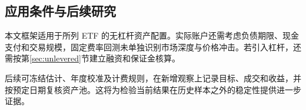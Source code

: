 \subsection{应用条件与后续研究}
本文框架适用于所列 ETF 的无杠杆资产配置。实际账户还需考虑负债期限、现金支付和交易规模，固定费率回测未单独识别市场深度与价格冲击\cite{almgren2001optimal}。若引入杠杆，还需按第\ref{sec:unlevered}节建立融资和保证金核算。

后续可冻结估计、年度校准及计费规则，在新增观察上记录目标、成交和收益，并按预定日期复核资产池。这将为检验当前结果在历史样本之外的稳定性提供进一步证据。
